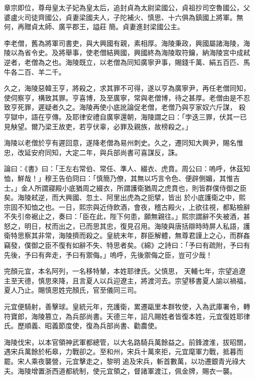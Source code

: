 \begin{pinyinscope}
 章宗即位，尊母皇太子妃為皇太后，追封貞為太尉梁國公，貞祖抄司空魯國公，父婆盧火司徒齊國公，貞妻梁國夫人，子陀補火、慎思、十六俱為鎮國上將軍。無何，再贈貞太師、廣平郡王，謚莊
 簡。貞妻進封梁國公主。



 李老僧，舊為將軍司書吏，與大興國有親，素相厚。海陵秉政，興國屬諸海陵，海陵以為省令史。及將舉事，使老僧結興國，興國終為海陵取符鑰，納海陵宮中成弒逆者，老僧為之也。海陵既立，以老僧為同知廣寧尹事，賜錢千萬、絹五百匹、馬牛各二百、羊二千。



 久之，海陵惡韓王亨，將殺之，求其罪不可得，遂以亨為廣寧尹，再任老僧同知，使伺察亨，構致其罪。亨喜博，及至廣寧，常與老僧博，待之甚厚。老僧由是不忍致亨死罪，遲疑者久之。海陵再使小底訛論促老僧，老僧乃與亨家奴六斤謀，
 殺亨獄中，語在亨傳。及耶律安禮自廣寧還朝，海陵謂之曰：「孛迭三罪，伏其一已見觖望。爾乃梁王故吏，若亨伏辜，必罪及親族，故榜殺之。」



 海陵以老僧於亨有遲回意，遂降老僧為易州刺史。久之，遷同知大興尹，賜名惟忠，改延安府同知，大定二年，與兵部尚書可喜謀反，誅。



 論曰：《書》曰：「王左右常伯、常任、準人、綴衣、虎賁。周公曰：嗚呼，休茲知恤，鮮哉！」穆王告伯冏曰：「慎簡乃僚，其無以巧言令色、便辟側媚，其惟吉士。」金人所謂寢殿小底猶周之綴衣，所謂護衛猶周之虎賁也，則皆群僕侍御之臣矣。海陵弒逆，而大興國、忽土、阿里出虎為之扼擘，皆出
 於小底護衛之中，熙宗固不知恤之也。一日，熙宗與近侍飲酒，會夜，稽古殿火，上欲往視，都點檢辭不失引帝裾止之，奏曰：「臣在此，陛下何患，願無親往。」熙宗謂辭不失被酒，甚怒之，明日，杖而出之，已而思其忠，復見召用。海陵與唐括辯時時屏人私語，護衛特思察其非常，海陵擠而殺之。皇統末年，群臣解體，無尊君謹上之心，而群姦竊發，僕御之臣不復有如辭不失、特思者矣。《綿》之詩曰：「予曰有疏附，予曰有先後，予曰有奔走，予曰有禦侮。」嗚呼，先後禦侮之臣，豈可少哉！



 完顏元宜，本名阿列，一名移特輦，本姓耶律氏。父慎思，
 天輔七年，宗望追遼主至天德，慎思來降，且言夏人以兵迎遼主，將渡河去。宗望移書夏人諭以禍福，夏人乃止。賜慎思姓完顏氏，官至儀同三司。



 元宜便騎射，善擊球。皇統元年，充護衛，累遷甌里本群牧使，入為武庫署令，轉符寶郎，海陵篡立，為兵部尚書。天德三年，詔凡賜姓者皆復本姓，元宜復姓耶律氏。歷順義、昭義節度使，復為兵部尚書、勸農使。



 海陵伐宋，以本官領神武軍都總管，以大名路騎兵萬餘益之。前鋒渡淮，拔昭關，遇宋兵萬餘於柘皋，力戰卻之。至和州，宋兵十萬來拒，元宜麾軍力戰，抵暮而罷。宋人乘夜襲營，元宜擊走之，黎明
 追及宋兵，斬首數萬，以功遷銀青光祿大夫。海陵增置浙西道都統制，使元宜領之，督諸軍渡江，佩金牌，賜衣一襲。




\end{pinyinscope}
